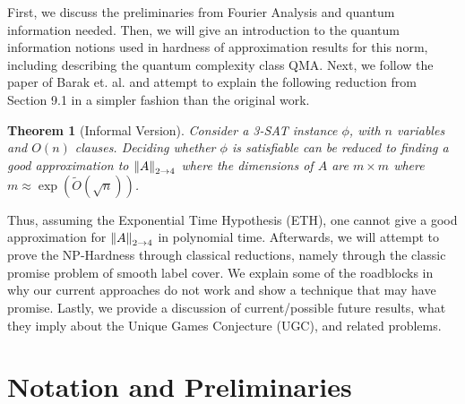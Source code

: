 \documentclass[10pt]{article}
\newcommand{\ATF}{\norm{A}_{2 \to 4}}
\newtheorem{theorem}{Theorem}
\begin{document}
First, we discuss the preliminaries from Fourier Analysis and quantum information needed. Then, we will give an introduction to the quantum information notions used in hardness of approximation results for this norm, including describing the quantum complexity class QMA. Next, we follow the paper of Barak et. al. \cite{Barak} and attempt to explain the following reduction from Section 9.1 in a simpler fashion than the original work.
\begin{theorem}[Informal Version] Consider a 3-SAT instance $\phi$, with $n$ variables and $O(n)$ clauses. Deciding whether $\phi$ is satisfiable can be reduced to finding a good approximation to $\ATF$ where the dimensions of $A$ are $m \times m$ where $m \approx \exp(\tilde{O}(\sqrt{n}))$. 
\end{theorem}
Thus, assuming the Exponential Time Hypothesis (ETH), one cannot give a good approximation for $\ATF$ in polynomial time. Afterwards, we will attempt to prove the NP-Hardness through classical reductions, namely through the classic promise problem of smooth label cover. We explain some of the roadblocks in why our current approaches do not work and show a technique that may have promise. Lastly, we provide a discussion of current/possible future results, what they imply about the Unique Games Conjecture (UGC), and related problems.

\section{Notation and Preliminaries}
\end{document}
